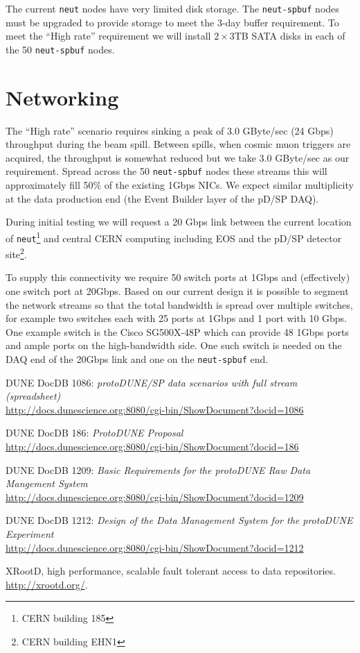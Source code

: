 \documentclass[pdftex,12pt,letter]{article}
\begin{document}
The current \texttt{neut} nodes have very limited disk storage.  The
\texttt{neut-spbuf} nodes must be upgraded to provide storage to meet
the 3-day buffer requirement. To meet the ``High rate'' requirement we
will install $2\times 3$TB SATA disks in each of the 50
\texttt{neut-spbuf} nodes.

\section{Networking}

The ``High rate'' scenario requires sinking a peak of 3.0 GByte/sec
(24 Gbps) throughput during the beam spill.  Between spills, when
cosmic muon triggers are acquired, the throughput is somewhat reduced
but we take 3.0 GByte/sec as our requirement.  Spread across the 50
\texttt{neut-spbuf} nodes these streams this will approximately fill
50\% of the existing 1Gbps NICs.  We expect similar multiplicity at
the data production end (the Event Builder layer of the pD/SP DAQ).

During initial testing we will request a 20 Gbps link between the
current location of \texttt{neut}\footnote{CERN building 185} and
central CERN computing including EOS and the pD/SP detector
site\footnote{CERN building EHN1}.

To supply this connectivity we require 50 switch ports at 1Gbps and
(effectively) one switch port at 20Gbps.  Based on our current design
it is possible to segment the network streams so that the total
bandwidth is spread over multiple switches, for example two switches
each with 25 ports at 1Gbps and 1 port with 10 Gbps.  One example
switch is the Cisco SG500X-48P which can provide 48 1Gbps ports and
ample ports on the high-bandwidth side.  One such switch is needed on
the DAQ end of the 20Gbps link and one on the \texttt{neut-spbuf} end.

\begin{thebibliography}{1}
{DUNE DocDB 1086: \textit{ protoDUNE/SP data scenarios with full stream (spreadsheet)}}\\
\url{http://docs.dunescience.org:8080/cgi-bin/ShowDocument?docid=1086}

{DUNE DocDB 186: \textit{ ProtoDUNE Proposal}}\\
\url{http://docs.dunescience.org:8080/cgi-bin/ShowDocument?docid=186}


{DUNE DocDB 1209: \textit{Basic Requirements for the protoDUNE Raw Data Mangement System}}\\
\url{http://docs.dunescience.org:8080/cgi-bin/ShowDocument?docid=1209}


{DUNE DocDB 1212: \textit{Design of the Data Management System for the protoDUNE Experiment}}\\
\url{http://docs.dunescience.org:8080/cgi-bin/ShowDocument?docid=1212}



{XRootD, high performance, scalable fault tolerant access to data  repositories}.\\
  \url{http://xrootd.org/}.

\end{thebibliography}
\end{document}
